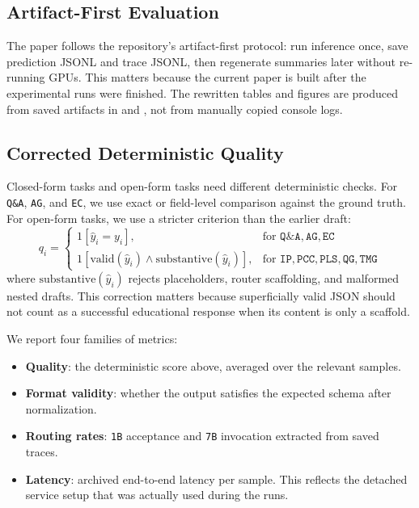 \documentclass{article}
\begin{document}
\subsection{Artifact-First Evaluation}
The paper follows the repository's artifact-first protocol: run inference once, save prediction JSONL and trace JSONL, then regenerate summaries later without re-running GPUs. This matters because the current paper is built after the experimental runs were finished. The rewritten tables and figures are produced from saved artifacts in  and , not from manually copied console logs.

\subsection{Corrected Deterministic Quality}
Closed-form tasks and open-form tasks need different deterministic checks. For \texttt{Q\&A}, \texttt{AG}, and \texttt{EC}, we use exact or field-level comparison against the ground truth. For open-form tasks, we use a stricter criterion than the earlier draft:
\[
q_i =
\begin{cases}
1[\hat{y}_i = y_i], & \text{for } \texttt{Q\&A}, \texttt{AG}, \texttt{EC} \\
1[\mathrm{valid}(\hat{y}_i) \land \mathrm{substantive}(\hat{y}_i)], & \text{for } \texttt{IP}, \texttt{PCC}, \texttt{PLS}, \texttt{QG}, \texttt{TMG}
\end{cases}
\]
where \(\mathrm{substantive}(\hat{y}_i)\) rejects placeholders, router scaffolding, and malformed nested drafts. This correction matters because superficially valid JSON should not count as a successful educational response when its content is only a scaffold.

We report four families of metrics:
\begin{itemize}
    \item \textbf{Quality}: the deterministic score above, averaged over the relevant samples.
    \item \textbf{Format validity}: whether the output satisfies the expected schema after normalization.
    \item \textbf{Routing rates}: \texttt{1B} acceptance and \texttt{7B} invocation extracted from saved traces.
    \item \textbf{Latency}: archived end-to-end latency per sample. This reflects the detached service setup that was actually used during the runs.
\end{itemize}
\end{document}
